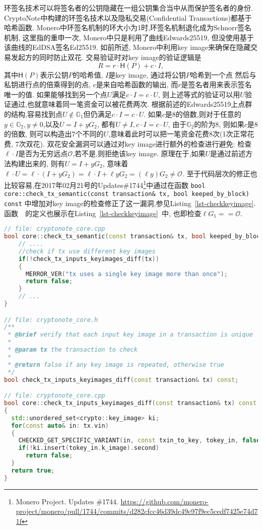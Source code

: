 \documentclass{article}
\renewcommand{\G}{\mathbb{G}}
\newcommand{\code}[1]{\lstinline!#1!}
\begin{document}
环签名技术可以将签名者的公钥隐藏在一组公钥集合当中从而保护签名者的身份.
CryptoNote中构建的环签名技术以及隐私交易(Confidential Transactions)都基于哈希函数.
Monero中环签名机制的环大小为1时,环签名机制退化成为Schnorr签名机制, 
这里指的重申一次, Monero中只是利用了曲线Edwards25519, 但没使用基于该曲线的EdDSA签名Ed25519.
如前所述, Monero中利用key image来确保在隐藏交易发起方的同时防止双花.
交易验证时对key image的验证逻辑是
$$R = r\cdot \textsf{H}(P) + c\cdot I,$$
其中$\textsf{H}(P)$表示公钥$P$的哈希值, $I$是key image, 通过将公钥$P$哈希到一个点
然后与私钥进行点的倍乘得到的点, $c$是来自哈希函数的输出, 
而$r$是签名者用来表示签名唯一的值. 如果能够找到另一个点$U$满足$c\cdot I = c\cdot U$,
则上述等式的验证可以用$U$验证通过,也就意味着同一笔资金可以被花费两次.
根据前述的Edwards25519上点群的结构,容易找到点$U\notin\G_1$但仍满足$c\cdot I = c\cdot U$.
如果$c$是8的倍数,则对于任意的$y\in \G_2, y\neq 0$,以及$U = I + yG_2$,
都有$U\neq I,  c\cdot I = c\cdot U$, 由于$\G_2$的阶为8, 则如果$c$是8的倍数,
则可以构造出7个不同的$U$,意味着此时可以把一笔资金花费8次(1次正常花费, 7次双花).
双花安全漏洞可以通过对key image进行额外的检查进行避免: 
检查$\ell \cdot I$是否为无穷远点$\mathcal{O}$,若不是,则拒绝该key image.
原理在于,如果$U$是通过前述方法构建出来的, 则有$U = I + yG_2$, 意味着
$\ell\cdot U = \ell\cdot(I + yG_2) = \ell\cdot I + \ell y G_2 = (\ell y)G_2 \neq \mathcal{O}$.
至于代码层次的修正也比较容易,在2017年02月21号的Updates\#1744\footnote{
Monero Project. Updates \#1744.
\url{https://github.com/monero-project/monero/pull/1744/commits/d282cfcc46d39dc49e97f9ec5cedf7425e74d71f}}中通过在函数
\code{bool core::check_tx_semantic(const transaction& tx, bool keeped_by_block) const}
中增加对key image的检查修正了这一漏洞,参见Listing~\ref{lst-checkkeyimage}. 
函数~\code{}~的定义也展示在Listing~\ref{lst-checkkeyimage}~中, 
也即检查$\ell G_1 == \mathcal{O}$.

\begin{lstlisting}[language=c++, caption=检查key image的唯一性, label=lst-checkkeyimage]
// file: cryptonote_core.cpp
bool core::check_tx_semantic(const transaction& tx, bool keeped_by_block) const{
    // .... 
    //check if tx use different key images
    if(!check_tx_inputs_keyimages_diff(tx))
    {
      MERROR_VER("tx uses a single key image more than once");
      return false;
    }
    // ... 
}

// file: cryptonote_core.h
/**
 * @brief verify that each input key image in a transaction is unique
 *
 * @param tx the transaction to check
 *
 * @return false if any key image is repeated, otherwise true
 */
bool check_tx_inputs_keyimages_diff(const transaction& tx) const;

// file: cryptonote_core.cpp
bool core::check_tx_inputs_keyimages_diff(const transaction& tx) const
{
  std::unordered_set<crypto::key_image> ki;
  for(const auto& in: tx.vin)
  {
    CHECKED_GET_SPECIFIC_VARIANT(in, const txin_to_key, tokey_in, false);
    if(!ki.insert(tokey_in.k_image).second)
      return false;
  }
  return true;
}
\end{lstlisting}
\end{document}
